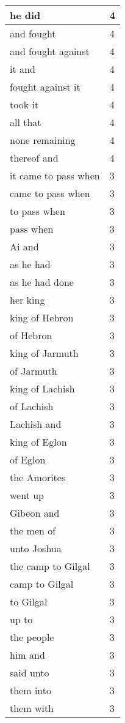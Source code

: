 \begin{center}
\begin{longtable}{|p{3.0in}|p{0.5in}|}
he did & 4\\ \hline 
and fought & 4\\ \hline 
and fought against & 4\\ \hline 
it and & 4\\ \hline 
fought against it & 4\\ \hline 
took it & 4\\ \hline 
all that & 4\\ \hline 
none remaining & 4\\ \hline 
thereof and & 4\\ \hline 
it came to pass when & 3\\ \hline 
came to pass when & 3\\ \hline 
to pass when & 3\\ \hline 
pass when & 3\\ \hline 
Ai and & 3\\ \hline 
as he had & 3\\ \hline 
as he had done & 3\\ \hline 
her king & 3\\ \hline 
king of Hebron & 3\\ \hline 
of Hebron & 3\\ \hline 
king of Jarmuth & 3\\ \hline 
of Jarmuth & 3\\ \hline 
king of Lachish & 3\\ \hline 
of Lachish & 3\\ \hline 
Lachish and & 3\\ \hline 
king of Eglon & 3\\ \hline 
of Eglon & 3\\ \hline 
the Amorites & 3\\ \hline 
went up & 3\\ \hline 
Gibeon and & 3\\ \hline 
the men of & 3\\ \hline 
unto Joshua & 3\\ \hline 
the camp to Gilgal & 3\\ \hline 
camp to Gilgal & 3\\ \hline 
to Gilgal & 3\\ \hline 
up to & 3\\ \hline 
the people & 3\\ \hline 
him and & 3\\ \hline 
said unto & 3\\ \hline 
them into & 3\\ \hline 
them with & 3\\ \hline 

\end{longtable}
\end{center}

